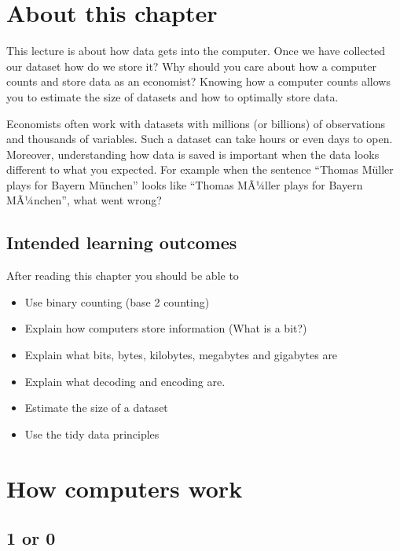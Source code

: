 \documentclass[]{book}
\providecommand{\tightlist}{%
  \setlength{\itemsep}{0pt}\setlength{\parskip}{0pt}}
\begin{document}
\hypertarget{about-this-chapter-9}{%
\section{About this chapter}\label{about-this-chapter-9}}

This lecture is about how data gets into the computer. Once we have collected our dataset how do we store it? Why should you care about how a computer counts and store data as an economist? Knowing how a computer counts allows you to estimate the size of datasets and how to optimally store data.

Economists often work with datasets with millions (or billions) of observations and thousands of variables. Such a dataset can take hours or even days to open. Moreover, understanding how data is saved is important when the data looks different to what you expected. For example when the sentence ``Thomas Müller plays for Bayern München'' looks like ``Thomas MÃ¼ller plays for Bayern MÃ¼nchen'', what went wrong?

\hypertarget{intended-learning-outcomes-7}{%
\subsection{Intended learning outcomes}\label{intended-learning-outcomes-7}}

After reading this chapter you should be able to

\begin{itemize}
\tightlist
\item
  Use binary counting (base 2 counting)
\item
  Explain how computers store information (What is a bit?)
\item
  Explain what bits, bytes, kilobytes, megabytes and gigabytes are
\item
  Explain what decoding and encoding are.
\item
  Estimate the size of a dataset
\item
  Use the tidy data principles
\end{itemize}

\hypertarget{how-computers-work}{%
\section{How computers work}\label{how-computers-work}}

\hypertarget{or-0}{%
\subsection{1 or 0}\label{or-0}}
\end{document}
